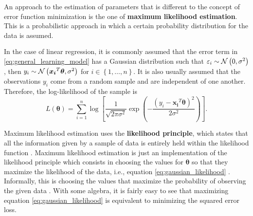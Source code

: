 An approach to the estimation of parameters that is different to the concept of error function minimization is the one of \textbf{maximum likelihood estimation}.
This is a probabilistic approach in which a certain probability distribution for the data is assumed.

In the case of linear regression, it is commonly assumed that the error term in \eqref{eq:general_learning_model} has a Gaussian distribution such that
$\varepsilon_i \sim \mathcal{N}\left( 0, \sigma^2 \right)$,
then $y_i \sim \mathcal{N}\left( \boldsymbol{x_i}^T \boldsymbol{\theta}, \sigma^2 \right)$ for $i \in \left\{ 1, \ldots, n \right\}$.
It is also usually assumed that the observations $y_i$ come from a random sample and are independent of one another. Therefore, the log-likelihood of the sample is
\begin{equation}
  \label{eq:gaussian_likelihood}
  L(\boldsymbol{\theta}) = \sum_{i = 1}^n \log \left[ \frac{1}{\sqrt{2 \pi \sigma^2}} \exp \left({- \frac{(y_i - \boldsymbol{x_i}^T \boldsymbol{\theta})^2}{2\sigma^2}}\right) \right].
\end{equation}


Maximum likelihood estimation uses the \textbf{likelihood principle}, which states that all the information given by a sample of data is entirely held within the likelihood function \cite{gelman2013bayesian} \cite{robert2007bayesian}. Maximum likelihood estimation is just an implementation of the likelihood principle which consists in choosing the values for $\boldsymbol{\theta}$ so that they maximize the likelihood of the data, i.e., equation \eqref{eq:gaussian_likelihood} \cite{robert2007bayesian}. Informally, this is choosing the values that maximize the probability of observing the given data \cite[p.~31]{friedman2001elements} \cite{robert2007bayesian}. With some algebra, it is fairly easy to see that maximizing equation \eqref{eq:gaussian_likelihood} is equivalent to minimizing the squared error loss.


